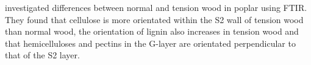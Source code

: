 \cite{Chang_2013} investigated differences between normal and tension wood in poplar using FTIR. They found that cellulose is more orientated within the S2 wall of tension wood than normal wood, the orientation of lignin also increases in tension wood and that hemicelluloses and pectins in the G-layer are orientated perpendicular to that of the S2 layer. 